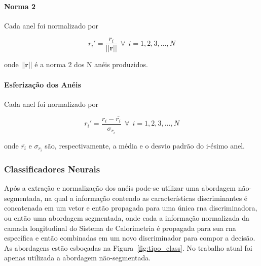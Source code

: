 \paragraph{Norma 2}
\label{par:norm2}

Cada anel foi normalizado por

\begin{equation}
r_{i}' = \frac{r_i}{||\mathbf{r}||}~~\forall~~i=1,2,3,...,N
\end{equation}

\noindent onde $||\mathbf{r}||$ é a norma 2 dos N anéis produzidos.


%
%
%


\paragraph{Esferização dos Anéis}

Cada anel foi normalizado por

\begin{equation}
r_{i}' = \frac{r_i - \bar{r_i}}{\sigma_{r_i }}~~\forall~~i=1,2,3,...,N
\end{equation}

\noindent onde $\bar{r_i}$ e $\sigma_{r_i }$ são, respectivamente, a média e o desvio 
padrão do i-ésimo anel. 


\subsubsection{Classificadores Neurais}
\label{sssec:rna}

Após a extração e normalização dos anéis pode-se utilizar uma abordagem não-segmentada, 
na qual a informação contendo as características discriminantes é concatenada em um vetor 
e então propagada para uma única \gls{rna} discriminadora, ou então uma abordagem segmentada, 
onde cada a informação normalizada da camada longitudinal do Sistema de Calorimetria é 
propagada para sua \gls{rna} específica e então combinadas em um novo
discriminador para compor a decisão. As abordagens estão esboçadas na
Figura~\ref{fig:tipo_class}. No trabalho atual foi apenas utilizada a abordagem 
não-segmentada.

